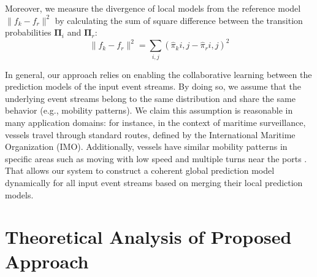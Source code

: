 \par Moreover, we measure the divergence of local models from the reference model  $\|f_k - f_r\|^2$ by calculating the sum of square difference between the transition probabilities  $\boldsymbol{\Pi}_i$ and  $\boldsymbol{\Pi}_r$:
\begin{equation*}
\label{eq:dis_pi_varinace}
\|f_k - f_r\|^2=\sum_{i,j} (\hat{\pi}_k{i,j} -\hat{\pi}_r{i,j})^2
\end{equation*}
\par In general, our approach relies on enabling the collaborative learning between the prediction models of  the input event streams. By doing so, we assume that the underlying event streams belong to the same  distribution and share the same behavior (e.g., mobility patterns). We claim this assumption is reasonable in many application domains: for instance, in the context of maritime surveillance, vessels travel through standard routes, defined by the International Maritime Organization (IMO). Additionally, vessels have similar mobility patterns in specific areas such as moving with low speed and multiple turns near the ports \cite{pallotta2013vessel,liu2014knowledge}. That allows our system to construct a coherent global prediction model dynamically for all input event streams based on merging their local prediction models.


\section{Theoretical Analysis of Proposed Approach}
 
 
